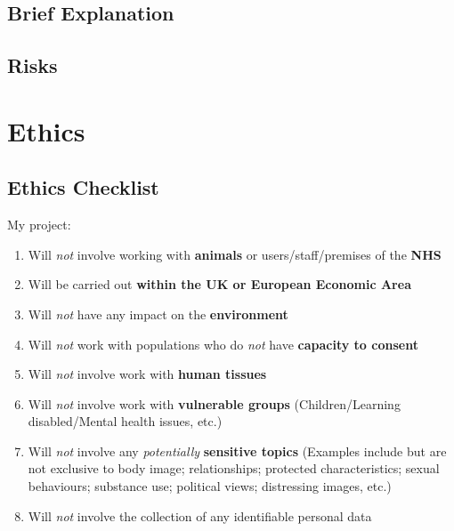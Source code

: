 \documentclass[a4paper]{article}
\begin{document}
\begin{ganttchart}
\end{ganttchart}

\subsection{Brief Explanation}

\subsection{Risks}


\clearpage

\section{Ethics}
\subsection{Ethics Checklist}
My project:
\begin{enumerate}
    \item Will \textit{not} involve working with \textbf{animals} or
        users/staff/premises of the \textbf{NHS}
    \item Will be carried out \textbf{within the UK or European
        Economic Area}
    \item Will \textit{not} have any impact on the \textbf{environment}
    \item Will \textit{not} work with populations who do \textit{not}
        have \textbf{capacity to consent}
    \item Will \textit{not} involve work with \textbf{human tissues}
    \item Will \textit{not} involve work with \textbf{vulnerable groups}
        (Children/Learning disabled/Mental health issues, etc.)
    \item Will \textit{not} involve any \textit{potentially}
        \textbf{sensitive topics} (Examples include but are not
        exclusive to body image; relationships; protected
        characteristics; sexual behaviours; substance use;
        political views; distressing images, etc.)
    \item Will \textit{not} involve the collection of any identifiable
        personal data
\end{enumerate}
\end{document}

